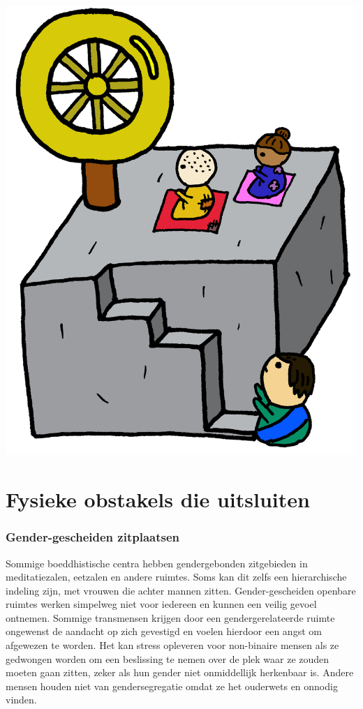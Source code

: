 \documentclass[12pt,openany]{book}
\begin{document}
\includegraphics[width=\textwidth]{17.png}

\section*{Fysieke obstakels die uitsluiten}

\subsubsection*{Gender-gescheiden zitplaatsen}

Sommige boeddhistische centra hebben gendergebonden zitgebieden in meditatiezalen, eetzalen en andere ruimtes. Soms kan dit zelfs een hierarchische indeling zijn, met vrouwen die achter mannen zitten. Gender-gescheiden openbare ruimtes werken simpelweg niet voor iedereen en kunnen een veilig gevoel ontnemen. Sommige transmensen krijgen door een gendergerelateerde ruimte ongewenst de aandacht op zich gevestigd en voelen hierdoor een angst om afgewezen te worden. Het kan stress opleveren voor non-binaire mensen als ze gedwongen worden om een beslissing te nemen over de plek waar ze zouden moeten gaan zitten, zeker als hun gender niet onmiddellijk herkenbaar is. Andere mensen houden niet van gendersegregatie omdat ze het ouderwets en onnodig vinden.
\end{document}
